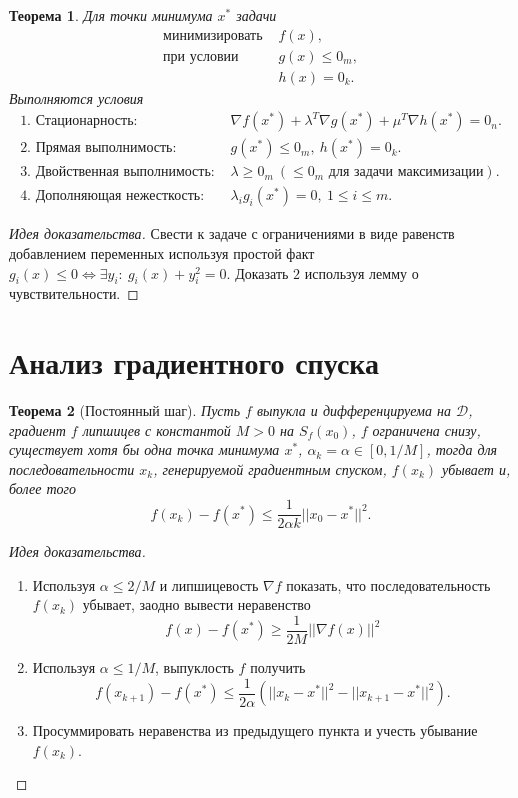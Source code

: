\documentclass[10pt,a4paper]{article}
\newtheorem{theorem_ru}{Теорема}[section]
\newenvironment{sketch}
    {\begin{proof}[Идея доказательства]
    }
    { 
    \end{proof}
    }
\begin{document}
\begin{theorem_ru}
Для точки минимума $x^*$ задачи
$$
\begin{array}{ll}
\mbox{минимизировать } & f(x),\\
\mbox{при условии }    & g(x)\leq 0_m,\\
					   & h(x)=0_k.
\end{array}
$$
Выполняются условия
$$
\begin{array}{ll}
\mbox{1. Стационарность: }& \nabla f(x^*) + \lambda^T\nabla g(x^*)+\mu^T \nabla h(x^*)=0_n.\\
\mbox{2. Прямая выполнимость: }&g(x^*)\leq 0_m,~h(x^*)=0_k.\\
\mbox{3. Двойственная выполнимость: }&\lambda\geq 0_m~(\leq 0_m \mbox{ для задачи максимизации}).\\
\mbox{4. Дополняющая нежесткость: }& \lambda_i g_i(x^*)=0,~1\leq i\leq m.
\end{array}
$$
\end{theorem_ru}
\begin{sketch}
Свести к задаче с ограничениями в виде равенств добавлением переменных используя простой факт $g_i(x)\leq 0\Leftrightarrow \exists y_i:~g_i(x)+y_i^2=0$. Доказать $2$ используя лемму о чувствительности.
\end{sketch}

\section{Анализ градиентного спуска}
\begin{theorem_ru}[Постоянный шаг]
Пусть $f$ выпукла и дифференцируема на $\mathcal{D}$, градиент $f$ липшицев с константой $M>0$ на $S_f(x_0)$, $f$ ограничена снизу,
существует хотя бы одна точка минимума $x^*$, $\alpha_k=\alpha\in [0, 1/M]$,
тогда для последовательности $x_k$, генерируемой градиентным спуском, $f(x_k)$ убывает и, более того
$$
f(x_k)-f(x^*)\leq \frac{1}{2\alpha k}||x_0-x^*||^2.
$$
\end{theorem_ru}
\begin{sketch}
\begin{enumerate}
\item Используя $\alpha \leq 2 / M$ и липшицевость $\nabla f$ показать, что последовательность $f(x_k)$ убывает, заодно вывести неравенство
$$
f(x)-f(x^*)\geq \frac{1}{2M}||\nabla f(x)||^2
$$
\item Используя $\alpha \leq 1 / M$, выпуклость $f$ получить
$$
f(x_{k+1})-f(x^*)\leq \frac{1}{2\alpha}(||x_k-x^*||^2-||x_{k+1}-x^*||^2).
$$
\item Просуммировать неравенства из предыдущего пункта и учесть убывание $f(x_k)$.
\end{enumerate}
\end{sketch}
\end{document}
